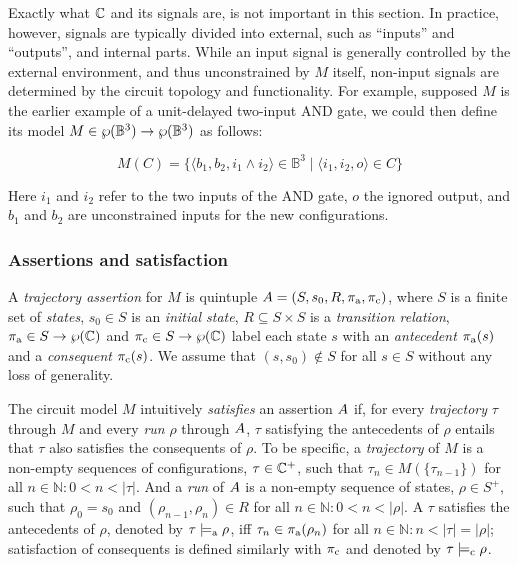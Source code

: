 
Exactly what $\mathbb{C}$ and its signals are, is not important in this section. In practice, however, signals are typically divided into external, such as ``inputs'' and ``outputs'', and internal parts. While an input signal is generally controlled by the external environment, and thus unconstrained by $M$ itself, non-input signals are determined by the circuit topology and functionality. For example, supposed $M$ is the earlier example of a unit-delayed two-input AND gate, we could then define its model $M \in \wp(\mathbb{B}^{3}) \rightarrow \wp(\mathbb{B}^{3})$ as follows:


\begin{equation*}
M(C) = \{ \langle b_{1}, b_{2}, i_{1} \wedge i_{2} \rangle \in \mathbb{B}^{3} \mid \langle i_{1}, i_{2}, o \rangle \in C \}
\end{equation*}

\noindent Here $i_{1}$ and $i_{2}$ refer to the two inputs of the AND gate, $o$ the ignored output, and $b_{1}$ and $b_{2}$ are unconstrained inputs for the new configurations.

\subsubsection{Assertions and satisfaction} \label{sec:set-ste-sat}

A \textit{trajectory assertion} for $M$ is quintuple $A = (S, s_{0}, R, \operatorname{\pi_{\textrm{a}}}, \operatorname{\pi_{\textrm{c}}})$, where $S$ is a finite set of \textit{states}, $s_{0} \in S$ is an \textit{initial state}, $R \subseteq S \times S$ is a \textit{transition relation}, $\operatorname{\pi_{\textrm{a}}} \in S \rightarrow \wp(\mathbb{C})$ and $\operatorname{\pi_{\textrm{c}}} \in S \rightarrow \wp(\mathbb{C})$ label each state $s$ with an \textit{antecedent} $\operatorname{\pi_{\textrm{a}}}(s)$ and a \textit{consequent} $\operatorname{\pi_{\textrm{c}}}(s)$. We assume that $(s,s_{0}) \notin S$ for all $s \in S$ without any loss of generality.

The circuit model $M$ intuitively \textit{satisfies} an assertion $A$ if, for every \textit{trajectory} $\tau$ through $M$ and every \textit{run} $\rho$ through $A$, $\tau$ satisfying the antecedents of $\rho$ entails that $\tau$ also satisfies the consequents of $\rho$. To be specific, a \textit{trajectory} of $M$ is a non-empty sequences of configurations, $\tau \in \mathbb{C}^{+}$, such that $\tau_{n} \in M(\{ \tau_{n-1} \})$ for all $n \in \mathbb{N} : 0 < n < | \tau |$. And a \textit{run} of $A$ is a non-empty sequence of states, $\rho \in S^{+}$, such that $\rho_{0} = s_{0}$ and $(\rho_{n-1}, \rho_{n}) \in R$ for all $n \in \mathbb{N} : 0 < n < | \rho |$. A $\tau$ satisfies the antecedents of $\rho$, denoted by $\tau \models_{\textrm{a}} \rho$, iff $\tau_{n} \in \operatorname{\pi_{\textrm{a}}}(\rho_{n})$ for all $n \in \mathbb{N} : n < | \tau | = | \rho |$; satisfaction of consequents is defined similarly with $\operatorname{\pi_{\textrm{c}}}$ and denoted by $\tau \models_{\textrm{c}} \rho$.

